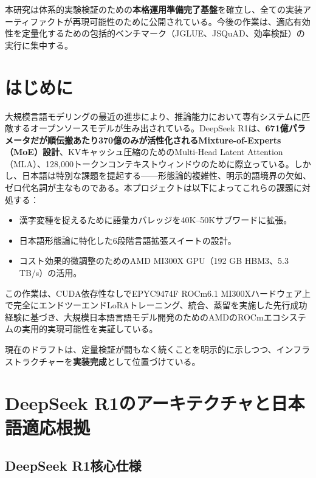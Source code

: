 \documentclass[12pt,a4paper]{article}
\begin{document}
本研究は体系的実験検証のための\textbf{本格運用準備完了基盤}を確立し、全ての実装アーティファクトが再現可能性のために公開されている。今後の作業は、適応有効性を定量化するための包括的ベンチマーク（JGLUE、JSQuAD、効率検証）の実行に集中する。

\section{はじめに}

大規模言語モデリングの最近の進歩により、推論能力において専有システムに匹敵するオープンソースモデルが生み出されている。DeepSeek R1は、\textbf{671億パラメータだが順伝搬あたり370億のみが活性化されるMixture-of-Experts（MoE）設計}、KVキャッシュ圧縮のためのMulti-Head Latent Attention（MLA）、128,000トークンコンテキストウィンドウのために際立っている。しかし、日本語は特別な課題を提起する——形態論的複雑性、明示的語境界の欠如、ゼロ代名詞が主なものである。本プロジェクトは以下によってこれらの課題に対処する：

\begin{itemize}
\item 漢字変種を捉えるために語彙カバレッジを40K–50Kサブワードに拡張。
\item 日本語形態論に特化した6段階言語拡張スイートの設計。
\item コスト効果的微調整のためのAMD MI300X GPU（192 GB HBM3、5.3 TB/s）の活用。
\end{itemize}

この作業は、CUDA依存性なしでEPYC9474F ROCm6.1 MI300Xハードウェア上で完全にエンドツーエンドLoRAトレーニング、統合、蒸留を実施した先行成功経験に基づき、大規模日本語言語モデル開発のためのAMDのROCmエコシステムの実用的実現可能性を実証している。

現在のドラフトは、定量検証が間もなく続くことを明示的に示しつつ、インフラストラクチャーを\textbf{実装完成}として位置づけている。

\section{DeepSeek R1のアーキテクチャと日本語適応根拠}

\subsection{DeepSeek R1核心仕様}
\end{document}
